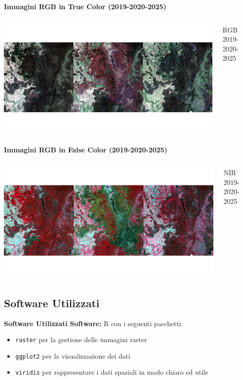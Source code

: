 \documentclass{beamer}
\begin{document}
\begin{frame}{\textbf{Immagini RGB in True Color (2019-2020-2025)}}
\begin{columns}
    \centering
    \includegraphics[width=\textwidth]{RGB_comparison.png}
    \caption{RGB 2019-2020-2025}
\end{columns}
\end{frame}

\begin{frame}{\textbf{Immagini RGB in False Color (2019-2020-2025)}}
\begin{columns}
    \centering
    \includegraphics[width=\textwidth]{RGB_comparison_2.png}
    \caption{NIR 2019-2020-2025}
\end{columns}
\end{frame}

\subsection{Software Utilizzati}

\begin{frame}{\textbf{Software Utilizzati}}
\textbf{Software:} R con i seguenti pacchetti:
\begin{itemize}
    \item \texttt{raster}{ per la gestione delle immagini raster}
    \item \texttt{ggplot2}{ per la visualizzazione dei dati}
    \item \texttt{viridis}{ per rappresentare i dati spaziali in modo chiaro ed utile}
\end{itemize}
\end{frame}
\end{document}
